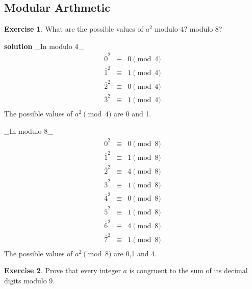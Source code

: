 \documentclass[
]{book}
\theoremstyle{definition}
\theoremstyle{definition}
\theoremstyle{definition}
\newtheorem{exercise}{Exercise}[chapter]
\theoremstyle{definition}
\theoremstyle{remark}
\begin{document}
\hypertarget{modular-arthmetic}{%
\subsection{Modular Arthmetic}\label{modular-arthmetic}}

\begin{exercise}
\protect\hypertarget{exr:unnamed-chunk-75}{}\label{exr:unnamed-chunk-75}What are the possible values of \(a^2\) modulo 4? modulo 8?
\end{exercise}

\textbf{solution}
\_In modulo 4\_\\
\begin{eqnarray*}
    \overline{0}^2&\equiv & 0 \pmod{4}\\
    \overline{1}^2&\equiv & 1 \pmod{4}\\
    \overline{2}^2&\equiv & 0 \pmod{4}\\
    \overline{3}^2&\equiv & 1 \pmod{4}\\
\end{eqnarray*}
The possible values of \(a^2\pmod{4}\) are 0 and 1.

\_In modulo 8\_\\
\begin{eqnarray*}
    \overline{0}^2&\equiv & 0 \pmod{8}\\
    \overline{1}^2&\equiv & 1 \pmod{8}\\
    \overline{2}^2&\equiv & 4 \pmod{8}\\
    \overline{3}^2&\equiv & 1 \pmod{8}\\
    \overline{4}^2&\equiv & 0 \pmod{8}\\
    \overline{5}^2&\equiv & 1 \pmod{8}\\
    \overline{6}^2&\equiv & 4 \pmod{8}\\
    \overline{7}^2&\equiv & 1 \pmod{8}\\
\end{eqnarray*}
The possible values of \(a^2\pmod{8}\) are 0,1 and 4.

\begin{exercise}
\protect\hypertarget{exr:unnamed-chunk-76}{}\label{exr:unnamed-chunk-76}Prove that every integer \(a\) is congruent to the sum of its decimal digits modulo 9.
\end{exercise}
\end{document}
